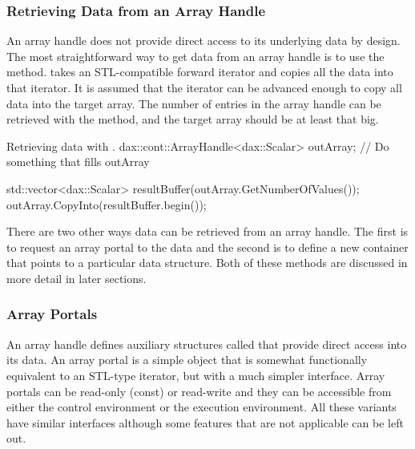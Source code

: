 \subsubsection{Retrieving Data from an Array Handle}

An array handle does not provide direct access to its underlying data by
design. The most straightforward way to get data from an array handle is to
use the  method.  takes an
STL-compatible forward iterator and copies all the data into that
iterator. It is assumed that the iterator can be advanced enough to copy
all data into the target array. The number of entries in the array handle
can be retrieved with the  method, and the
target array should be at least that big.

\begin{daxexample}{Retrieving  data with .}
dax::cont::ArrayHandle<dax::Scalar> outArray;
// Do something that fills outArray

std::vector<dax::Scalar> resultBuffer(outArray.GetNumberOfValues());
outArray.CopyInto(resultBuffer.begin());
\end{daxexample}

There are two other ways data can be retrieved from an array handle. The
first is to request an array portal to the data and the second is to define
a new container that points to a particular data structure. Both of these
methods are discussed in more detail in later sections.

\subsubsection{Array Portals}
\label{sec:ArrayPortals}


An array handle defines auxiliary structures called 
that provide direct access into its data. An array portal is a simple
object that is somewhat functionally equivalent to an STL-type iterator, but
with a much simpler interface. Array portals can be read-only (const) or
read-write and they can be accessible from either the control environment
or the execution environment. All these variants have similar interfaces
although some features that are not applicable can be left out.

